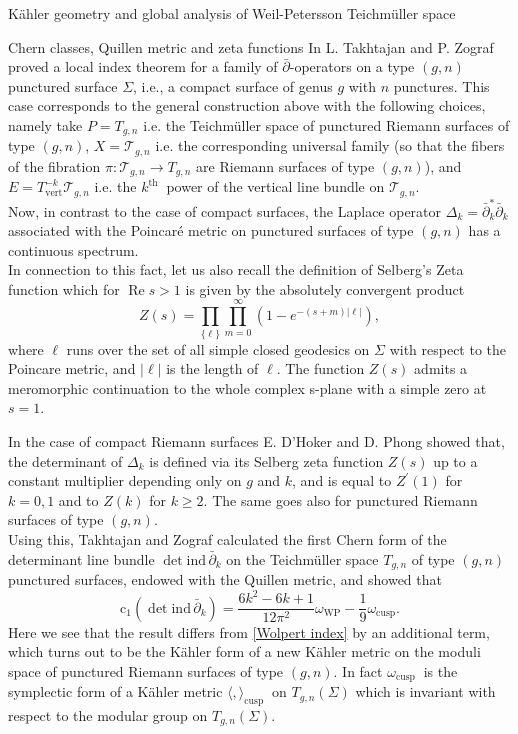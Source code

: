 \documentclass[12pt]{amsart}
\theoremstyle{plain}
\theoremstyle{definition}
\theoremstyle{remark}
\numberwithin{equation}{section} %
\numberwithin{figure}{section} %
\begin{document}
\begin{section}{K\"ahler geometry and global analysis of Weil-Petersson Teichm\"uller space}
\begin{subsection}{Chern classes, Quillen metric and zeta functions}
In \cite {TakhtajanZograf} L. Takhtajan and P. Zograf  proved a local index theorem for a family of \(\bar{\partial}\)-operators on a type \((g, n)\) punctured surface $\Sigma$, i.e., a compact surface of genus \(g\) with \(n\) punctures. 
This case corresponds to the general construction above with the following choices, namely take \(P=T_{g, n}\) i.e. the Teichmüller space of punctured Riemann
surfaces of type \((g, n)\), \(X=\mathscr{T}_{g, n}\) i.e. the
corresponding universal family (so that the fibers of the fibration \(\pi: \mathscr{T}_{g, n} \rightarrow T_{g, n}\)
are Riemann surfaces of type \((g, n)\)), and \({E}=T_{\mathrm{vert}}^{-k} \mathscr{T}_{g, n}\) i.e. the \(k^{\text {th }}\) power of the
vertical line bundle on \(\mathscr{T}_{g,n}\).\\

Now, in contrast to the case of compact surfaces, the Laplace operator \(\Delta_{k}=\bar{\partial}_{k}^{*} \bar{\partial}_{k}\)
associated with the Poincar\'e metric on punctured surfaces of type \((g, n)\) has a continuous spectrum.\\
In connection to this fact, let us also recall the definition of Selberg's Zeta function which for \(\operatorname{Re} s>1\) is given by the absolutely convergent product
$$
Z(s)=\prod_{\{\ell\}} \prod_{m=0}^{\infty}\left(1-e^{-(s+m)|\ell|}\right),
$$
where \(\ell\) runs over the set of all simple closed geodesics on \(\Sigma\) with respect
to the Poincare metric, and \(|\ell|\) is the length of \(\ell\). The function \(Z(s)\) admits a
meromorphic continuation to the whole complex s-plane with a simple zero at
\(s=1\).


In the case of compact Riemann surfaces
E. D'Hoker and D. Phong \cite {DHokerPhong} showed that, the determinant
of \(\Delta_{k}\) is defined via its Selberg zeta function \(Z(s)\) up to a constant multiplier depending
only on \(g\) and \(k\), and is equal to \(Z^{\prime}(1)\) for \(k=0,1\) and to \(Z(k)\) for \(k \geq 2\). The same goes also for punctured Riemann surfaces of type \((g, n)\).\\

 Using this, Takhtajan and Zograf calculated the first Chern form of the determinant
line bundle $\det \mathrm{ind}\, \bar{\partial}_{k}$ on the Teichmüller space \(T_{g, n}\) of type $(g,n)$ punctured surfaces, endowed with the Quillen metric, and showed that 
\begin{equation}
\mathrm{c}_{1}(\det \mathrm{ind}\, \bar{\partial}_{k})=\frac{6k^2-6k+1}{12\pi^2}\omega_{\mathrm{WP}}-\frac{1}{9} \omega_{\mathrm{cusp }}.
\end{equation}
Here we see that the result differs from \eqref{Wolpert index} by an additional term, which turns out to be the Kähler form of a new
Kähler metric on the moduli space of punctured Riemann surfaces of type $(g, n)$. In fact \(\omega_{\text {cusp }}\) is the symplectic form of a Kähler metric \(\langle,\rangle_{\text {cusp }}\) on \(T_{g, n} (\Sigma)\)
which is invariant with respect to the modular group on \(T_{g, n} (\Sigma)\). 


\end{subsection}
\end{section}
\end{document}
